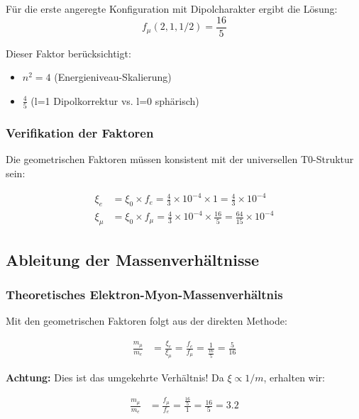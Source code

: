 Für die erste angeregte Konfiguration mit Dipolcharakter ergibt die Lösung:
\begin{equation}
	f_\mu(2,1,1/2) = \frac{16}{5}
\end{equation}

Dieser Faktor berücksichtigt:
\begin{itemize}
	\item $n^2 = 4$ (Energieniveau-Skalierung)
	\item $\frac{4}{5}$ (l=1 Dipolkorrektur vs. l=0 sphärisch)
\end{itemize}

\subsubsection{Verifikation der Faktoren}

Die geometrischen Faktoren müssen konsistent mit der universellen T0-Struktur sein:

\begin{align}
	\xi_e &= \xi_0 \times f_e = \frac{4}{3} \times 10^{-4} \times 1 = \frac{4}{3} \times 10^{-4}\\
	\xi_\mu &= \xi_0 \times f_\mu = \frac{4}{3} \times 10^{-4} \times \frac{16}{5} = \frac{64}{15} \times 10^{-4}
\end{align}

\subsection{Ableitung der Massenverhältnisse}

\subsubsection{Theoretisches Elektron-Myon-Massenverhältnis}

Mit den geometrischen Faktoren folgt aus der direkten Methode:

\begin{align}
	\frac{m_\mu}{m_e} &= \frac{\xi_e}{\xi_\mu} = \frac{f_e}{f_\mu} = \frac{1}{\frac{16}{5}} = \frac{5}{16}
\end{align}

\textbf{Achtung:} Dies ist das umgekehrte Verhältnis! Da $\xi \propto 1/m$, erhalten wir:

\begin{align}
	\frac{m_\mu}{m_e} &= \frac{f_\mu}{f_e} = \frac{\frac{16}{5}}{1} = \frac{16}{5} = 3.2
\end{align}


